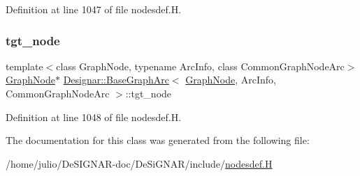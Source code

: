 Definition at line 1047 of file nodesdef.\+H.

\mbox{\label{class_designar_1_1_base_graph_arc_af09ee39743d9a2e6f7bad479d925c273}} 
\subsubsection{\texorpdfstring{tgt\+\_\+node}{tgt\_node}}
{\footnotesize\ttfamily template$<$class Graph\+Node, typename Arc\+Info, class Common\+Graph\+Node\+Arc$>$ \\
\hyperlink{class_designar_1_1_graph_node}{Graph\+Node}$\ast$ \hyperlink{class_designar_1_1_base_graph_arc}{Designar\+::\+Base\+Graph\+Arc}$<$ \hyperlink{class_designar_1_1_graph_node}{Graph\+Node}, Arc\+Info, Common\+Graph\+Node\+Arc $>$\+::tgt\+\_\+node\hspace{0.3cm}{\ttfamily [protected]}}



Definition at line 1048 of file nodesdef.\+H.



The documentation for this class was generated from the following file\+:\begin{DoxyCompactItemize}
\item 
/home/julio/\+De\+S\+I\+G\+N\+A\+R-\/doc/\+De\+Si\+G\+N\+A\+R/include/\hyperlink{nodesdef_8_h}{nodesdef.\+H}\end{DoxyCompactItemize}
